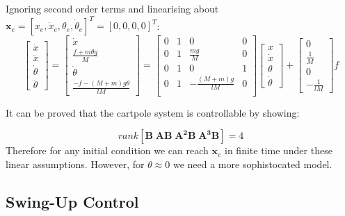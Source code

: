 \documentclass[12pt]{report}
\begin{document}
Ignoring second order terms and linearising about $\boldsymbol{x}_e = [x_e, \dot{x}_e, \theta_e, \dot{\theta}_e]^T = [0, 0, 0, 0]^T$:
\begin{equation}
\begin{bmatrix} \dot{x} \\ \ddot{x} \\ \dot{\theta} \\ \ddot{\theta} \end{bmatrix} 
=   \begin{bmatrix} 
    \dot{x} \\ 
    \frac{f + m\theta g}{M} \\ 
    \dot{\theta} \\ 
    \frac{- f - (M+m)g\theta}{lM} 
    \end{bmatrix}
=   \begin{bmatrix} 
    0 & 1 & 0 & 0 \\
    0 & 1 & \frac{mg}{M} & 0 \\
    0 & 1 & 0 & 1 \\
    0 & 1 & -\frac{(M+m)g}{lM} & 0 \\
    \end{bmatrix}
    \begin{bmatrix} x \\ \dot{x} \\ \theta \\ \dot{\theta} \end{bmatrix}
+  \begin{bmatrix} 0 \\ \frac{1}{M} \\ 0 \\ -\frac{1}{lM} \end{bmatrix} f
\end{equation}

It can be proved that the cartpole system is controllable by showing:

\begin{equation}
    rank[\boldsymbol{B} \; \boldsymbol{AB} \; \boldsymbol{A^2B} \; \boldsymbol{A^3B}] = 4
\end{equation}
Therefore for any initial condition we can reach $\boldsymbol{x}_e$ in finite time under these linear assumptions.
However, for $\theta \approx 0$ we need a more sophistocated model.

\subsection{Swing-Up Control}
\end{document}
